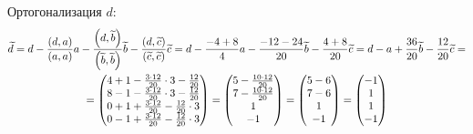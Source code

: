 \documentclass[12pt]{article}
\begin{document}
    Ортогонализация $d$:
    \begin{multline*}
        \widetilde{d}
        = d - \frac{\left ( d, a \right )}{\left ( a, a \right )} a - \frac{\left ( d, \widetilde{b} \right )}{\left ( \widetilde{b}, \widetilde{b} \right )} \widetilde{b} - \frac{\left ( d, \widetilde{c} \right )}{\left ( \widetilde{c}, \widetilde{c} \right )} \widetilde{c}
        = d - \frac{-4 + 8}{4} a - \frac{-12 - 24}{20} \widetilde{b} - \frac{4 + 8}{20} \widetilde{c}
        = d - a + \frac{36}{20} \widetilde{b} - \frac{12}{20} \widetilde{c} = \\
        =
        \begin{pmatrix}
            4 + 1 - \frac{3 \cdot 12}{20} \cdot 3 - \frac{12}{20} \\
            8 - 1 - \frac{3 \cdot 12}{20} \cdot 3 - \frac{12}{20} \\
            0 + 1 + \frac{3 \cdot 12}{20} - \frac{12}{20} \cdot 3 \\
            0 - 1 + \frac{3 \cdot 12}{20} - \frac{12}{20} \cdot 3
        \end{pmatrix}
        =
        \begin{pmatrix}
            5 - \frac{10 \cdot 12}{20} \\
            7 - \frac{10 \cdot 12}{20} \\
            1                          \\
            -1
        \end{pmatrix}
        =
        \begin{pmatrix}
            5 - 6 \\
            7 - 6 \\
            1     \\
            -1
        \end{pmatrix}
        =
        \begin{pmatrix}
            -1 \\
            1  \\
            1  \\
            -1
        \end{pmatrix}
    \end{multline*}
\end{document}
